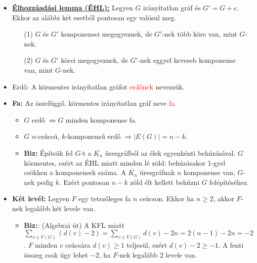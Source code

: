 \documentclass[../../szobeli.tex]{subfiles}
\begin{document}
\begin{center}
    \noindent{}
\end{center}
    \begin{itemize}
        \item \underline{\textbf{Élhozzáadási lemma (ÉHL):}} Legyen $G$ irányítatlan gráf és $G' = G + e$. Ekkor az alábbi két esetből pontosan egy valósul meg. \begin{itemize}
            \item[(1)] $G$ és $G'$ komponensei megegyeznek, de $G'$-nek több köre van, mint $G$-nek.
            \item[(2)] $G$ és $G'$ körei megegyeznek, de $G'$-nek eggyel keveseb komponense van, mint $G$-nek. 
        \end{itemize}
        \item Erdő: A körmentes irányítatlan gráfot \textcolor{red}{erdőnek} nevezzük. 
        \item \textbf{Fa:} Az öszefüggő, körmentes irányítatlan gráf neve \textcolor{red}{fa}. \begin{itemize}
            \item $G$ erdő $\Longleftrightarrow  G$ minden komponense fa.
            \item $G$ $n$-csúcsú, $k$-komponensű erdő $\Rightarrow |E(G)| = n-k$.
            \item \textbf{Biz:} Építsük fel $G$-t a $\overline{K_n}$ üresgráfból az élek egyenkénti behúzásával. $G$ körmentes, ezért az ÉHL miatt minden lé zöld: behúzásakor 1-gyel csökken a komponensek száma. A $\overline{K_n}$ üresgráfnak $n$ komponense van, $G$-nek pedig $k$. Ezért pontosan $n-k$ zöld élt kellett behúzni $G$ felépítéséhez.
        \end{itemize}
        \item \textbf{Két levél:} Legyen $F$ egy tetszőleges fa $n$ csúcson. Ekkor ha $n \geq 2$, akkor $F$-nek legalább két levele van.
        \begin{itemize}
            \item \textbf{Biz:}: (Algebrai út) A KFL miatt $\sum_{v\in V(G)}(d(v)-2)=\sum_{v\in V(G)}d(v)-2n=2(n-1)-2n=-2$. $F$ minden $v$ csúcsára $d(v) \geq 1$ teljesül, ezért $d(v) - 2 \geq -1$. A fenti összeg csak úgy lehet $-2$, ha $F$-nek legalább 2 levele van.

\end{itemize}
\end{itemize}
\end{document}
